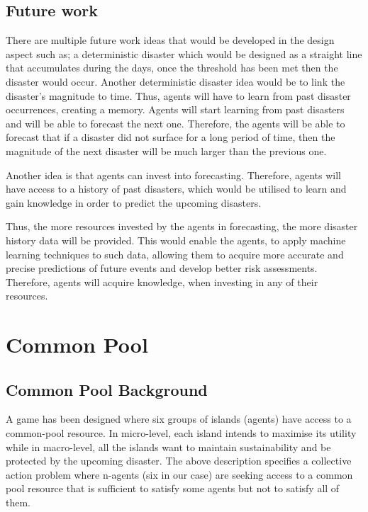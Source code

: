 \subsection{Future work}

There are multiple future work ideas that would be developed in the design aspect such as; a deterministic disaster which would be  designed as a straight line that accumulates during the days, once the threshold has been met then the disaster would occur. Another deterministic disaster idea would be to link the disaster’s magnitude to time. Thus, agents will have to learn from past disaster occurrences, creating a memory. Agents will start learning from past disasters and will be able to forecast the next one. Therefore, the agents will be able to forecast that if a disaster did not surface for a long period of time, then the magnitude of the next disaster will be much larger than the previous one.

Another idea is that agents can invest into forecasting. Therefore, agents will have access to a history of past disasters, which would be utilised to learn and gain knowledge in order to predict the upcoming disasters.

Thus, the more resources invested by the agents in forecasting, the more disaster history data will be provided. This would enable the agents, to apply machine learning techniques to such data, allowing them to acquire more accurate and precise predictions of future events and develop better risk assessments. Therefore, agents will acquire knowledge, when investing in any of their resources.

\section{Common Pool}
\subsection{Common Pool Background}

A game has been designed where six groups of islands (agents) have access to a common-pool resource. In micro-level, each island intends to maximise its utility while in macro-level, all the islands want to maintain sustainability and be protected by the upcoming disaster. The above description specifies a collective action problem where n-agents (six in our case) are seeking access to a common pool resource that is sufficient to satisfy some agents but not to satisfy all of them.

